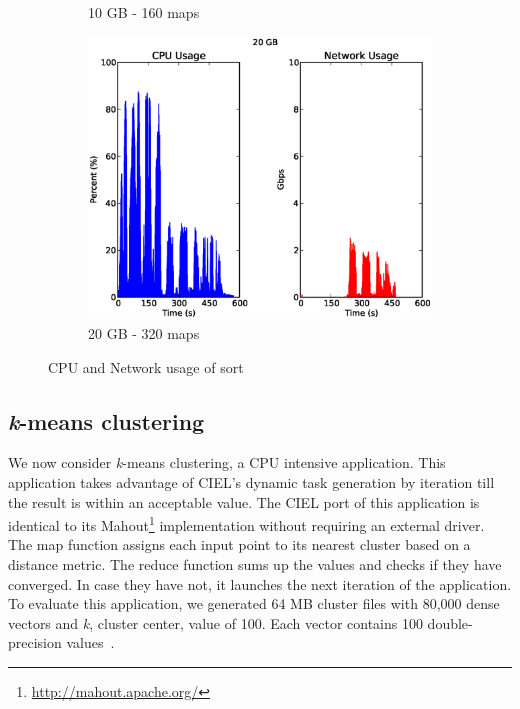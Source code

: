 \documentclass[a4paper,12pt,twoside,openright]{report}
\begin{document}
\begin{figure}[h!]
\begin{subfigure}[b]{0.33\textwidth}
                \caption{10 GB - 160 maps}
                \label{fig:10GBsortres}
        \end{subfigure}
        \begin{subfigure}[b]{0.33\textwidth}
                \centering
                \includegraphics[width=\textwidth]{320maps.csv.eps}
                \caption{20 GB - 320 maps}
                \label{fig:20GBsortres}
        \end{subfigure}
        \caption{CPU and Network usage of sort}
        \label{chap:eval:sec:ciel:fig:sortres}
\end{figure}

\subsection{\emph{k}-means clustering}
We now consider \emph{k}-means clustering, a CPU intensive application. This
application takes advantage of CIEL's dynamic task generation by iteration till
the result is within an acceptable value. The CIEL port of this application is
identical to its Mahout\footnote{\url{http://mahout.apache.org/}}
implementation without requiring an external driver. The map function assigns
each input point to its nearest cluster based on a distance metric. The reduce
function sums up the values and checks if they have converged. In case they have
not, it launches the next iteration of the application. To evaluate this
application, we generated 64 MB cluster files with 80,000 dense vectors and
\emph{k}, cluster center, value of 100. Each vector contains 100
double-precision values~\cite{Murray:2011:CUE}.
\end{document}
